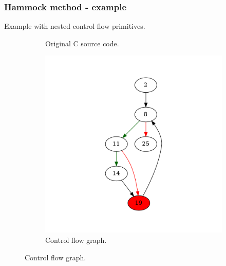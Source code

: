 \documentclass[aspectratio=1610]{beamer}
\begin{document}
\begin{frame}[noframenumbering]
	\frametitle{Hammock method - example}
	Example with nested control flow primitives.
	\begin{figure}[htbp]
		\centering
		\begin{subfigure}[b]{0.30\textwidth}
			\centering
			
			\caption{Original C source code.}
		\end{subfigure}
		\begin{subfigure}[b]{0.50\textwidth}
			\centering
			\includegraphics[height=0.6\paperheight]{inc/methods/hammock/example/without-break/main_0001b.png}
			\caption{Control flow graph.}
		\end{subfigure}
	\end{figure}
\end{frame}
\end{document}
